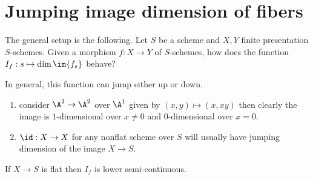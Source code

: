\documentclass[12pt]{article}
\begin{document}
\section{Jumping image dimension of fibers}

The general setup is the following. Let $S$ be a scheme and $X,Y$ finite presentation $S$-schemes. Given a morphism $f : X \to Y$ of $S$-schemes, how does the function $I_f : s \mapsto \dim{\im{f_s}}$ behave?

\begin{example}
In general, this function can jump either up or down.
\begin{enumerate}
\item consider $\A^2 \to \A^2$ over $\A^1$ given by $(x,y) \mapsto (x, xy)$ then clearly the image is $1$-dimensional over $x \neq 0$ and $0$-dimensional over $x = 0$.
\item $\id : X \to X$ for any nonflat scheme over $S$ will usually have jumping dimension of the image $X \to S$. 
\end{enumerate}
\end{example}

\begin{prop}
If $X \to S$ is flat then $I_f$ is lower semi-continuous.
\end{prop}
\end{document}
